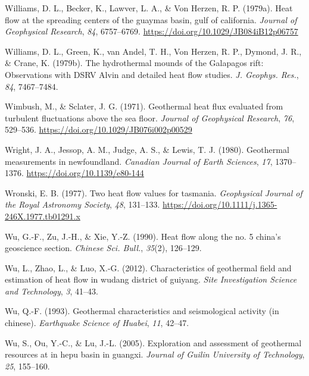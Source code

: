\begin{CSLReferences}{1}{1}
\leavevmode{}%
Williams, D. L., Becker, K., Lawver, L. A., \& Von Herzen, R. P. (1979a). Heat flow at the spreading centers of the guaymas basin, gulf of california. \emph{Journal of Geophysical Research}, \emph{84}, 6757--6769. \url{https://doi.org/10.1029/JB084iB12p06757}

\leavevmode{}%
Williams, D. L., Green, K., van Andel, T. H., Von Herzen, R. P., Dymond, J. R., \& Crane, K. (1979b). The hydrothermal mounds of the {Galapagos} rift: Observations with {DSRV Alvin} and detailed heat flow studies. \emph{J. Geophys. Res.}, \emph{84}, 7467--7484.

\leavevmode{}%
Wimbush, M., \& Sclater, J. G. (1971). Geothermal heat flux evaluated from turbulent fluctuations above the sea floor. \emph{Journal of Geophysical Research}, \emph{76}, 529--536. \url{https://doi.org/10.1029/JB076i002p00529}

\leavevmode{}%
Wright, J. A., Jessop, A. M., Judge, A. S., \& Lewis, T. J. (1980). Geothermal measurements in newfoundland. \emph{Canadian Journal of Earth Sciences}, \emph{17}, 1370--1376. \url{https://doi.org/10.1139/e80-144}

\leavevmode{}%
Wronski, E. B. (1977). Two heat flow values for tasmania. \emph{Geophysical Journal of the Royal Astronomy Society}, \emph{48}, 131--133. \url{https://doi.org/10.1111/j.1365-246X.1977.tb01291.x}

\leavevmode{}%
Wu, G.-F., Zu, J.-H., \& Xie, Y.-Z. (1990). Heat flow along the no. 5 china's geoscience section. \emph{Chinese Sci. Bull.}, \emph{35}(2), 126--129.

\leavevmode{}%
Wu, L., Zhao, L., \& Luo, X.-G. (2012). Characteristics of geothermal field and estimation of heat flow in wudang district of guiyang. \emph{Site Investigation Science and Technology}, \emph{3}, 41--43.

\leavevmode{}%
Wu, Q.-F. (1993). Geothermal characteristics and seismological activity (in chinese). \emph{Earthquake Science of Huabei}, \emph{11}, 42--47.

\leavevmode{}%
Wu, S., Ou, Y.-C., \& Lu, J.-L. (2005). Exploration and assessment of geothermal resources at in hepu basin in guangxi. \emph{Journal of Guilin University of Technology}, \emph{25}, 155--160.


\end{CSLReferences}
